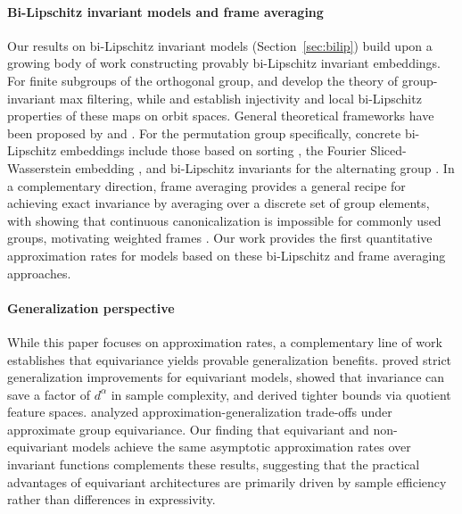 \documentclass[twoside,11pt]{article}
\begin{document}
\paragraph{Bi-Lipschitz invariant models and frame averaging}
Our results on bi-Lipschitz invariant models (Section~\ref{sec:bilip}) build upon a growing body of work constructing provably bi-Lipschitz invariant embeddings. For finite subgroups of the orthogonal group, \citet{cahill2024group} and \citet{mixon2023max} develop the theory of group-invariant max filtering, while \citet{max_mixon2025} and \citet{max_QADDURA} establish injectivity and local bi-Lipschitz properties of these maps on orbit spaces. General theoretical frameworks have been proposed by \citet{cahill2024towards} and \citet{balan2023g}. For the permutation group specifically, concrete bi-Lipschitz embeddings include those based on sorting \citep{balan2022permutation,davidson2024}, the Fourier Sliced-Wasserstein embedding \citep{amir2024fsw,fswgnn}, and bi-Lipschitz invariants for the alternating group \citep{Mizrachi}. In a complementary direction, frame averaging \citep{punyframe} provides a general recipe for achieving exact invariance by averaging over a discrete set of group elements, with \citet{dym2024equivariant} showing that continuous canonicalization is impossible for commonly used groups, motivating weighted frames \citep{pozdnyakov2023smooth}. Our work provides the first quantitative approximation rates for models based on these bi-Lipschitz and frame averaging approaches.

\paragraph{Generalization perspective}
While this paper focuses on approximation rates, a complementary line of work establishes that equivariance yields provable generalization benefits. \citet{elesedy2021provably} proved strict generalization improvements for equivariant models, \citet{mei2021} showed that invariance can save a factor of $d^\alpha$ in sample complexity, and \citet{sannai2021improved} derived tighter bounds via quotient feature spaces. \citet{trivedi} analyzed approximation-generalization trade-offs under approximate group equivariance. Our finding that equivariant and non-equivariant models achieve the same asymptotic approximation rates over invariant functions complements these results, suggesting that the practical advantages of equivariant architectures are primarily driven by sample efficiency rather than differences in expressivity.
\end{document}
